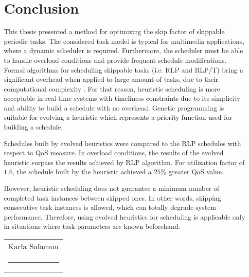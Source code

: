 \chapter{Conclusion}
This thesis presented a method for optimizing the skip factor of skippable periodic tasks.
The considered task model is typical for multimedia applications, where a dynamic scheduler is required.
Furthermore, the scheduler must be able to handle overload conditions and provide frequent schedule modifications.
Formal algorithms for scheduling skippable tasks (i.e. RLP and RLP/T) bring a significant overhead when applied to large amount of tasks, due to their computational complexity \cite{onqos}.
For that reason, heuristic scheduling is more acceptable in real-time systems with timeliness constraints due to its simplicity and ability to build a schedule with no overhead.
Genetic programming is suitable for evolving a heuristic which represents a priority function used for building a schedule.

Schedules built by evolved heuristics were compared to the RLP schedules with respect to QoS measure.
In overload conditions, the results of the evolved heuristic surpass the results achieved by RLP algorithm.
For utilization factor of $1.6$, the schedule built by the heuristic achieved a $25\%$ greater QoS value.

However, heuristic scheduling does not guarantee a minimum number of completed task instances between skipped ones.
In other words, skipping consecutive task instances is allowed, which can totally degrade system performance.
Therefore, using evolved heuristics for scheduling is applicable only in situations where task parameters are known beforehand.

\newcommand{\namesigdate}[2][5cm]{%
  \begin{tabular}{@{}p{#1}@{}}
    #2 \\[2\normalbaselineskip] \hrule \\[15pt]
  \end{tabular}}

\vspace*{\fill} \noindent \hfill \namesigdate{Karla Salamun}
